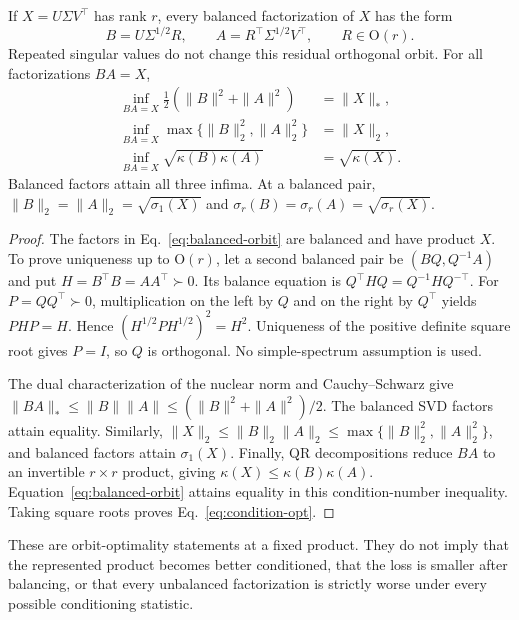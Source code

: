 \begin{theorem}
\label{thm:balanced-optimal}
If $X=U\Sigma V^\top$ has rank $r$, every balanced factorization of $X$
has the form
\begin{equation}
 B=U\Sigma^{1/2}R,\qquad A=R^\top\Sigma^{1/2}V^\top,
 \qquad R\in\mathrm O(r).
 \label{eq:balanced-orbit}
\end{equation}
Repeated singular values do not change this residual orthogonal orbit.
For all factorizations $BA=X$,
\begin{align}
 \inf_{BA=X}\tfrac12(\|B\|^2+\|A\|^2)&=\|X\|_*,\label{eq:nuclear-opt}\\
 \inf_{BA=X}\max\{\|B\|_2^2,\|A\|_2^2\}&=\|X\|_2,\label{eq:operator-opt}\\
 \inf_{BA=X}\sqrt{\kappa(B)\kappa(A)}&=\sqrt{\kappa(X)}.
 \label{eq:condition-opt}
\end{align}
Balanced factors attain all three infima. At a balanced pair,
$\|B\|_2=\|A\|_2=\sqrt{\sigma_1(X)}$ and
$\sigma_r(B)=\sigma_r(A)=\sqrt{\sigma_r(X)}$.
\end{theorem}
\begin{proof}
The factors in Eq.~\eqref{eq:balanced-orbit} are balanced and have product
$X$. To prove uniqueness up to $\mathrm O(r)$, let a second balanced pair
be $(BQ,Q^{-1}A)$ and put $H=B^\top B=AA^\top\succ0$.
Its balance equation is $Q^\top H Q=Q^{-1}HQ^{-\top}$.
For $P=QQ^\top\succ0$, multiplication on the left by $Q$ and on the right
by $Q^\top$ yields $PHP=H$. Hence
$(H^{1/2}PH^{1/2})^2=H^2$. Uniqueness of the positive definite square root
gives $P=I$, so $Q$ is orthogonal. No simple-spectrum assumption is used.

The dual characterization of the nuclear norm and Cauchy--Schwarz give
$\|BA\|_*\leq\|B\|\|A\|\leq(\|B\|^2+\|A\|^2)/2$.
The balanced SVD factors attain equality. Similarly,
$\|X\|_2\leq\|B\|_2\|A\|_2\leq\max\{\|B\|_2^2,\|A\|_2^2\}$,
and balanced factors attain $\sigma_1(X)$. Finally, QR decompositions
reduce $BA$ to an invertible $r\times r$ product, giving
$\kappa(X)\leq\kappa(B)\kappa(A)$. Equation~\eqref{eq:balanced-orbit}
attains equality in this condition-number inequality. Taking square roots
proves Eq.~\eqref{eq:condition-opt}.
\end{proof}

These are orbit-optimality statements at a fixed product. They do not imply
that the represented product becomes better conditioned, that the loss is
smaller after balancing, or that every unbalanced factorization is strictly
worse under every possible conditioning statistic.

